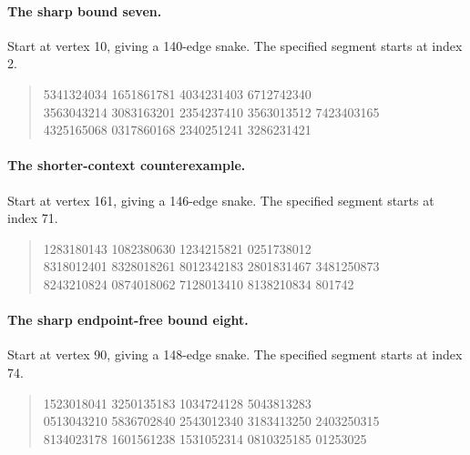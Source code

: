 \documentclass[11pt,a4paper]{article}
\theoremstyle{definition}
\theoremstyle{remark}
\begin{document}
\paragraph{The sharp bound seven.} Start at vertex 10, giving a 140-edge snake. The specified segment starts at index 2.
\begin{quote}\small{} 5341324034 1651861781 4034231403 6712742340\\
3563043214 3083163201 2354237410 3563013512 7423403165\\
4325165068 0317860168 2340251241 3286231421
\end{quote}

\paragraph{The shorter-context counterexample.} Start at vertex 161, giving a 146-edge snake. The specified segment starts at index 71.
\begin{quote}\small{} 1283180143 1082380630 1234215821 0251738012\\
8318012401 8328018261 8012342183 2801831467 3481250873\\
8243210824 0874018062 7128013410 8138210834 801742
\end{quote}

\paragraph{The sharp endpoint-free bound eight.} Start at vertex 90, giving a 148-edge snake. The specified segment starts at index 74.
\begin{quote}\small{} 1523018041 3250135183 1034724128 5043813283\\
0513043210 5836702840 2543012340 3183413250 2403250315\\
8134023178 1601561238 1531052314 0810325185 01253025
\end{quote}
\end{document}
